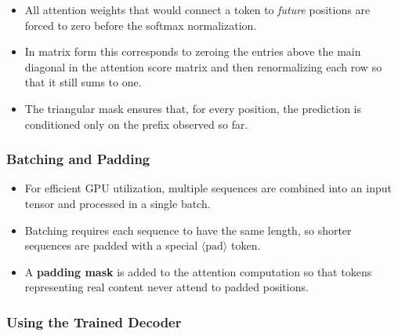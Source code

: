\documentclass[11pt,a4paper]{article}
\theoremstyle{definition}
\theoremstyle{plain}
\theoremstyle{remark}
\begin{document}
\begin{itemize}
    \item All attention weights that would connect a token to \emph{future} positions are forced to zero before the softmax normalization.
    \item In matrix form this corresponds to zeroing the entries above the main diagonal in the attention score matrix and then renormalizing each row so that it still sums to one.
    \item The triangular mask ensures that, for every position, the prediction is conditioned only on the prefix observed so far.
\end{itemize}

\begin{center}
\end{center}

\subsubsection{Batching and Padding}

\begin{itemize}
    \item For efficient GPU utilization, multiple sequences are combined into an input tensor and processed in a single batch.
    \item Batching requires each sequence to have the same length, so shorter sequences are padded with a special $\langle\text{pad}\rangle$ token.
    \item A \textbf{padding mask} is added to the attention computation so that tokens representing real content never attend to padded positions.
\end{itemize}

\subsubsection{Using the Trained Decoder}
\end{document}
